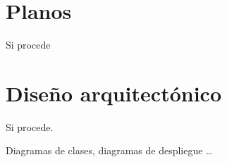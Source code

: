 \section{Planos}

Si procede

\section{Diseño arquitectónico}

Si procede.

Diagramas de clases, diagramas de despliegue \ldots

